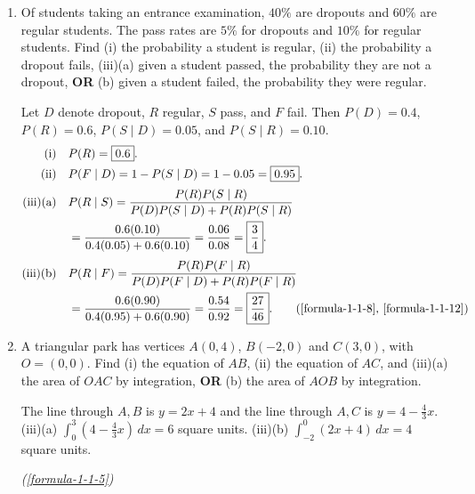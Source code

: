 \begin{enumerate}[label={},leftmargin=1.15cm,labelwidth=1.0cm,labelsep=0.15cm,itemindent=0pt,listparindent=0pt,itemsep=\baselineskip,parsep=0pt,topsep=0pt]
\newpage
\item[3.1.37] Of students taking an entrance examination, $40\%$ are dropouts and $60\%$ are regular students. The pass rates are $5\%$ for dropouts and $10\%$ for regular students. Find (i) the probability a student is regular, (ii) the probability a dropout fails, (iii)(a) given a student passed, the probability they are not a dropout, \textbf{OR} (b) given a student failed, the probability they were regular.

\vspace{0.6em}\par\solution


Let $D$ denote dropout, $R$ regular, $S$ pass, and $F$ fail. Then $P(D)=0.4$, $P(R)=0.6$, $P(S\mid D)=0.05$, and $P(S\mid R)=0.10$.
\begin{align*}
\text{(i)}\quad&P(R)=\boxed{0.6}.\\
\text{(ii)}\quad&P(F\mid D)=1-P(S\mid D)=1-0.05=\boxed{0.95}.\\[2pt]
\text{(iii)(a)}\quad&P(R\mid S)=\frac{P(R)P(S\mid R)}{P(D)P(S\mid D)+P(R)P(S\mid R)}\\
&=\frac{0.6(0.10)}{0.4(0.05)+0.6(0.10)}=\frac{0.06}{0.08}=\boxed{\frac34}.\\[2pt]
\text{(iii)(b)}\quad&P(R\mid F)=\frac{P(R)P(F\mid R)}{P(D)P(F\mid D)+P(R)P(F\mid R)}\\
&=\frac{0.6(0.90)}{0.4(0.95)+0.6(0.90)}=\frac{0.54}{0.92}=\boxed{\frac{27}{46}}.\tag*{(\ref{formula-1-1-8}, \ref{formula-1-1-12})}\end{align*}

\item[3.1.38] A triangular park has vertices $A(0,4)$, $B(-2,0)$ and $C(3,0)$, with $O=(0,0)$. Find (i) the equation of $AB$, (ii) the equation of $AC$, and (iii)(a) the area of $OAC$ by integration, \textbf{OR} (b) the area of $AOB$ by integration.

\vspace{0.6em}\par\solution


The line through $A,B$ is $\boxed{y=2x+4}$ and the line through $A,C$ is $\boxed{y=4-\frac43x}$. (iii)(a) $\int_0^3(4-\frac43x)\,dx=\boxed{6}$ square units. (iii)(b) $\int_{-2}^0(2x+4)\,dx=\boxed{4}$ square units.
\par\noindent\hfill\mbox{\textit{(\ref{formula-1-1-5})}}\par\end{enumerate}
